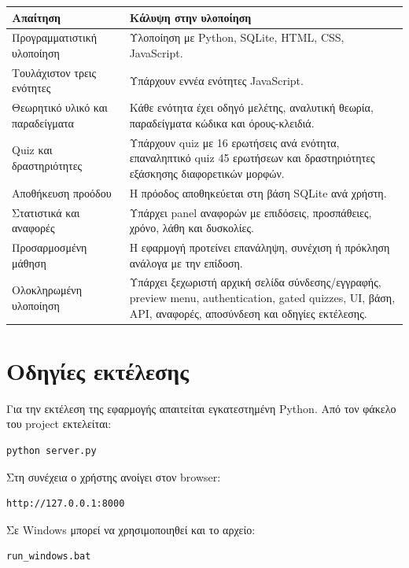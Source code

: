 \documentclass[12pt,a4paper]{article}
\newcommand{\textlatin}[1]{\textenglish{#1}}
\begin{document}
\begin{longtable}{|p{5cm}|p{9cm}|}
\hline
\textbf{Απαίτηση} & \textbf{Κάλυψη στην υλοποίηση} \\
\hline
Προγραμματιστική υλοποίηση & Υλοποίηση με \textlatin{Python}, \textlatin{SQLite}, \textlatin{HTML}, \textlatin{CSS}, \textlatin{JavaScript}. \\
\hline
Τουλάχιστον τρεις ενότητες & Υπάρχουν εννέα ενότητες JavaScript. \\
\hline
Θεωρητικό υλικό και παραδείγματα & Κάθε ενότητα έχει οδηγό μελέτης, αναλυτική θεωρία, παραδείγματα κώδικα και όρους-κλειδιά. \\
\hline
Quiz και δραστηριότητες & Υπάρχουν quiz με 16 ερωτήσεις ανά ενότητα, επαναληπτικό quiz 45 ερωτήσεων και δραστηριότητες εξάσκησης διαφορετικών μορφών. \\
\hline
Αποθήκευση προόδου & Η πρόοδος αποθηκεύεται στη βάση SQLite ανά χρήστη. \\
\hline
Στατιστικά και αναφορές & Υπάρχει panel αναφορών με επιδόσεις, προσπάθειες, χρόνο, λάθη και δυσκολίες. \\
\hline
Προσαρμοσμένη μάθηση & Η εφαρμογή προτείνει επανάληψη, συνέχιση ή πρόκληση ανάλογα με την επίδοση. \\
\hline
Ολοκληρωμένη υλοποίηση & Υπάρχει ξεχωριστή αρχική σελίδα σύνδεσης/εγγραφής, preview menu, authentication, gated quizzes, UI, βάση, API, αναφορές, αποσύνδεση και οδηγίες εκτέλεσης. \\
\hline
\end{longtable}

\section{Οδηγίες εκτέλεσης}

Για την εκτέλεση της εφαρμογής απαιτείται εγκατεστημένη \textlatin{Python}. Από τον φάκελο του project εκτελείται:

\begin{lstlisting}
python server.py
\end{lstlisting}

Στη συνέχεια ο χρήστης ανοίγει στον browser:

\begin{lstlisting}
http://127.0.0.1:8000
\end{lstlisting}

Σε Windows μπορεί να χρησιμοποιηθεί και το αρχείο:

\begin{lstlisting}
run_windows.bat
\end{lstlisting}
\end{document}
